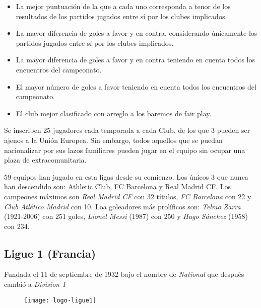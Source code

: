 \begin{itemize}

	\item La mejor puntuación de la que a cada uno corresponda a tenor de los resultados de los partidos jugados entre sí por los clubes implicados.

	\item La mayor diferencia de goles a favor y en contra, considerando únicamente los partidos jugados entre sí por los clubes implicados.

	\item La mayor diferencia de goles a favor y en contra teniendo en cuenta todos los encuentros del campeonato.

	\item El mayor número de goles a favor teniendo en cuenta todos los encuentros del campeonato.

	\item El club mejor clasificado con arreglo a los baremos de fair play.

\end{itemize}

Se inscriben 25 jugadores cada temporada a cada Club, de los que 3 pueden ser ajenos a la Unión Europea. Sin embargo, todos aquellos que se puedan nacionalizar por sus lazos familiares pueden jugar en el equipo sin ocupar una plaza de extracomunitaria.

59 equipos han jugado en esta ligas desde su comienzo. Los únicos 3 que nunca han descendido son: Athletic Club, FC Barcelona y Real Madrid CF. Los campeones máximos son \emph{Real Madrid CF} con 32 títulos, \emph{FC Barcelona} con 22 y \emph{Club Atlético Madrid} con 10. Loa goleadores más prolíficos son: \emph{Telmo Zarra} (1921-2006) con 251 goles, \emph{Lionel Messi} (1987) con 250 y \emph{Hugo Sánchez} (1958) con 234.\cite{primera}

\subsection{Ligue 1 (Francia)}

Fundada el 11 de septiembre de 1932 bajo el nombre de \emph{National} que después cambió a \emph{Division 1}

\begin{figure}[!htb]\centering
   \begin {minipage}{0.5\textwidth}
     \texttt{[image: logo-ligue1]}
   \end{minipage}
\end{figure}


